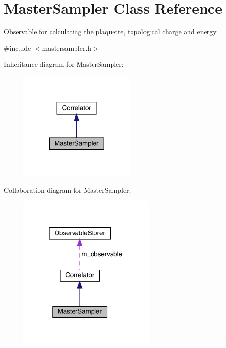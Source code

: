 \hypertarget{class_master_sampler}{}\section{Master\+Sampler Class Reference}
\label{class_master_sampler}


Observable for calculating the plaquette, topological charge and energy.  




{\ttfamily \#include $<$mastersampler.\+h$>$}



Inheritance diagram for Master\+Sampler\+:
\nopagebreak
\begin{figure}[H]
\begin{center}
\leavevmode
\includegraphics[width=164pt]{class_master_sampler__inherit__graph}
\end{center}
\end{figure}


Collaboration diagram for Master\+Sampler\+:
\nopagebreak
\begin{figure}[H]
\begin{center}
\leavevmode
\includegraphics[width=193pt]{class_master_sampler__coll__graph}
\end{center}
\end{figure}
